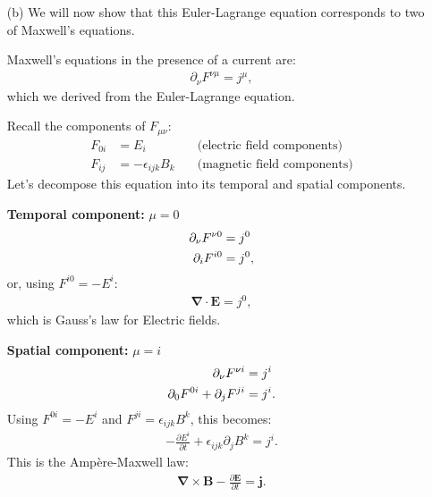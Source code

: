 \begin{itemize}
\item [(b)] We will now show that this Euler-Lagrange equation corresponds to two of Maxwell’s equations.

Maxwell's equations in the presence of a current are:
\begin{align}
    \partial_\nu F^{\nu\mu} = j^\mu,
\end{align}
which we derived from the Euler-Lagrange equation.

Recall the components of $F_{\mu\nu}$:
\begin{align}
    F_{0i} &= E_i \quad &\text{(electric field components)}\label{eq:e-field-components}\\
    F_{ij} &= -\epsilon_{ijk} B_k\label{eq:b-field-components} \quad &\text{(magnetic field components)}
\end{align}
Let’s decompose this equation into its temporal and spatial components.

\textbf{Temporal component:} $\mu = 0$
\begin{align*}
    \partial_\nu F^{\nu 0} &= j^0\notag\\
    \partial_i F^{i0} &= j^0,
\end{align*}
or, using $F^{i0} = -E^i$:
\begin{align}
    \mathbf{\nabla} \cdot \mathbf{E} = j^0,
\end{align}
which is Gauss's law for Electric fields.

\textbf{Spatial component:} $\mu = i$
\begin{align*}
    \partial_\nu F^{\nu i} &= j^i\notag\\
    \partial_0 F^{0i} + \partial_j F^{ji} &= j^i.
\end{align*}
Using $F^{0i} = -E^i$ and $F^{ji} = \epsilon_{ijk} B^k$, this becomes:
\begin{align*}
    -\frac{\partial E^i}{\partial t} + \epsilon_{ijk} \partial_j B^k = j^i.
\end{align*}
This is the Ampère-Maxwell law:
\begin{align}
    \mathbf{\nabla} \times \mathbf{B} - \frac{\partial \mathbf{E}}{\partial t} = \mathbf{j}.
\end{align}
\end{itemize}
\bigskip\bigskip\hline\hline\bigskip